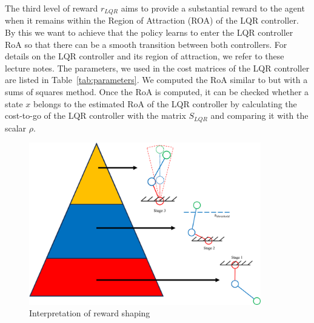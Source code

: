 The third level of reward $r_{LQR}$ aims to provide a substantial reward to the
agent when it remains within the Region of Attraction (ROA) of the LQR
controller. By this we want to achieve that the policy learns to enter the LQR
controller RoA so that there can be a smooth transition between both
controllers. For details on the LQR controller and its region of attraction, we
refer to these lecture notes. The parameters, we used in
the cost matrices of the LQR controller are listed in
Table~\ref{tab:parameters}. We computed the RoA similar to
but with a sums of squares method.  Once the RoA is computed,
it can be checked whether a state $x$ belongs to the estimated RoA of the LQR
controller by calculating the cost-to-go of the LQR controller with the matrix
$S_{LQR}$ and comparing it with the scalar $\rho$.

\begin{figure}[htbp]
    \centering
    \includegraphics[width=0.9\textwidth]{figures/reward_explained.png} %
    \caption{Interpretation of reward shaping}
    \label{fig:example}
\end{figure}

\cleardoublepage
